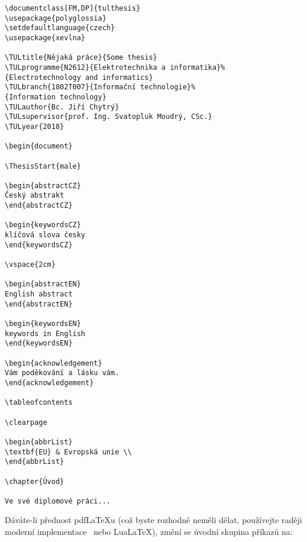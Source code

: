 \documentclass[FM,SP]{tulthesis}
\newenvironment{myquote}{\begin{list}{}{\setlength\leftmargin\parindent}\item[]}{\end{list}}
\newenvironment{listing}{\begin{myquote}\color{\tulcolor}}{\end{myquote}}
\begin{document}
\begin{listing}
\begin{verbatim}
\documentclass[FM,DP]{tulthesis}
\usepackage{polyglossia}
\setdefaultlanguage{czech}
\usepackage{xevlna}

\TULtitle{Nějaká práce}{Some thesis}
\TULprogramme{N2612}{Elektrotechnika a informatika}%
{Electrotechnology and informatics}
\TULbranch{1802T007}{Informační technologie}%
{Information technology}
\TULauthor{Bc. Jiří Chytrý}
\TULsupervisor{prof. Ing. Svatopluk Moudrý, CSc.}
\TULyear{2018}

\begin{document}

\ThesisStart{male}

\begin{abstractCZ}
Český abstrakt
\end{abstractCZ}

\begin{keywordsCZ}
klíčová slova česky
\end{keywordsCZ}

\vspace{2cm}

\begin{abstractEN}
English abstract
\end{abstractEN}

\begin{keywordsEN}
keywords in English
\end{keywordsEN}

\begin{acknowledgement}
Vám poděkování a lásku vám.
\end{acknowledgement}

\tableofcontents

\clearpage

\begin{abbrList}
\textbf{EU} & Evropská unie \\
\end{abbrList}

\chapter{Úvod}

Ve své diplomové práci...
\end{verbatim}
\end{listing}

Dáváte-li přednost pdf\LaTeX u (což byste rozhodně neměli dělat, používejte raději
moderní implementace \XeLaTeX\ nebo Lua\LaTeX), změní se úvodní skupina příkazů na:
\end{document}
